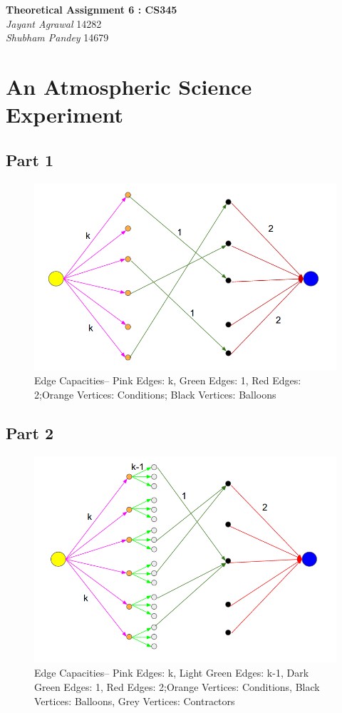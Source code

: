 \documentclass{article}
\begin{document}

\begin{center}
\textbf{\Large Theoretical Assignment 6 : CS345} \\
\textit{\large Jayant Agrawal}         14282 \\
\textit{\large Shubham Pandey}         14679
\end{center}

\section{An Atmospheric Science Experiment}

\subsection{Part 1}
\begin{figure}[h!]
\centering
\includegraphics[width=0.5\columnwidth]{fig_one.png}
\caption{ Edge Capacities-- Pink Edges: k, Green Edges: 1, Red Edges: 2;\newline Orange Vertices: Conditions; Black Vertices: Balloons}
\label{sim}
\end{figure}

\subsection{Part 2}
\begin{figure}[h!]
\centering
\includegraphics[width=0.5\columnwidth]{fig_dif.png}
\caption{ Edge Capacities-- Pink Edges: k, Light Green Edges: k-1, Dark Green Edges: 1, Red Edges: 2;\newline Orange Vertices: Conditions, Black Vertices: Balloons, Grey Vertices: Contractors}
\label{sim}
\end{figure}
\end{document}
